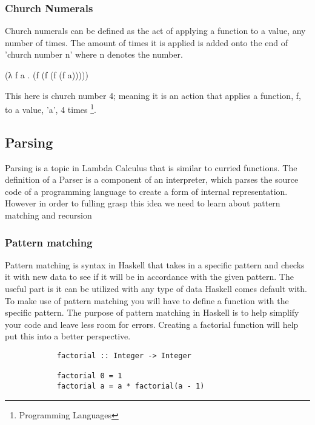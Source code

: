 \documentclass{article}
\begin{document}
    
        \subsubsection{Church Numerals}
        Church numerals can be defined as the act of applying a function to a value, any number of times. The amount of times it is applied is added onto the end of 'church number n' where n denotes the number.
        
        \medskip
             (\lambda λ f a . (f (f (f (f a)))))
        \medskip
    
    \noindent This here is church number 4; meaning it is an action that applies a function, f, to a value, 'a', 4 times \footnote{Programming Languages}.
        
    \subsection{Parsing}
    Parsing is a topic in Lambda Calculus that is similar to curried functions. The definition of a Parser is a component of an interpreter, which parses the source code of a programming language to create a form of internal representation. However in order to fulling grasp this idea we need to learn about pattern matching and recursion
        
        \subsubsection{Pattern matching}
        Pattern matching is syntax in Haskell that takes in a specific pattern and checks it with new data to see if it will be in accordance with the given pattern. The useful part is it can be utilized with any type of data Haskell comes default with. To make use of pattern matching you will have to define a function with the specific pattern. The purpose of pattern matching in Haskell is to help simplify your code and leave less room for errors. Creating a factorial function will help put this into a better perspective. 
        
        \begin{lstlisting}
            factorial :: Integer -> Integer 
            
            factorial 0 = 1
            factorial a = a * factorial(a - 1)
        \end{lstlisting}
        
\end{document}
